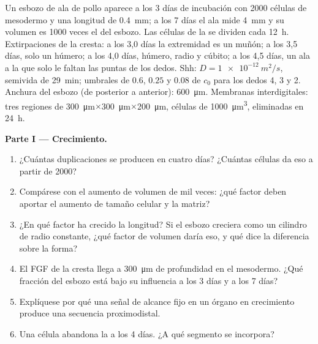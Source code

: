 \begin{problem}
\label{pb:b2:limb-organogenesis:1}
Un esbozo de ala de pollo aparece a los 3 días de incubación con
\num{2000} células de mesodermo y una longitud de \qty{0.4}{mm}; a los 7
días el ala mide \qty{4}{mm} y su volumen es \num{1000} veces el del
esbozo. Las células de la  se dividen cada \qty{12}{h}.
Extirpaciones de la cresta: a los 3,0 días la extremidad es un muñón; a
los 3,5 días, solo un húmero; a los 4,0 días, húmero, radio y cúbito; a
los 4,5 días, un ala a la que solo le faltan las puntas de los dedos.
Shh: $D = \qty{1e-12}{m^2/s}$, semivida de \qty{29}{min}; umbrales de
$0.6$, $0.25$ y $0.08$ de $c_0$ para los dedos 4, 3 y 2. Anchura del
esbozo (de posterior a anterior): \qty{600}{\micro m}. Membranas
interdigitales: tres regiones de
\qty{300}{\micro m}$\times$\qty{300}{\micro m}$\times$\qty{200}{\micro m},
células de \qty{1000}{\micro m^3}, eliminadas en \qty{24}{h}.

\medskip
\noindent\textbf{Parte I --- Crecimiento.}
\begin{enumerate}
  \item ¿Cuántas duplicaciones se producen en cuatro días? ¿Cuántas
        células da eso a partir de \num{2000}?
  \item Compárese con el aumento de volumen de mil veces: ¿qué factor deben
        aportar el aumento de tamaño celular y la matriz?
  \item ¿En qué factor ha crecido la longitud? Si el esbozo creciera como
        un cilindro de radio constante, ¿qué factor de volumen daría eso, y
        qué dice la diferencia sobre la forma?
  \item El FGF de la cresta llega a \qty{300}{\micro m} de profundidad en
        el mesodermo. ¿Qué fracción del esbozo está bajo su influencia a
        los 3 días y a los 7 días?
  \item Explíquese por qué una señal de alcance fijo en un órgano en
        crecimiento produce una secuencia proximodistal.
  \item Una célula abandona la  a los 4 días. ¿A qué
        segmento se incorpora?
\end{enumerate}


\end{problem}
